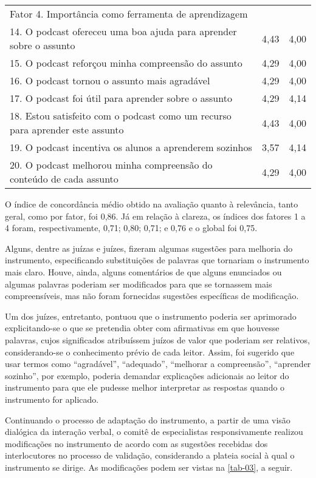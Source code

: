 \begin{table}[htpb]
\begin{threeparttable}
\begin{tabular}{p{10cm} l l}
Fator 4. Importância como ferramenta de aprendizagem & & \\
14. O podcast ofereceu uma boa ajuda para aprender sobre o assunto & 4,43 & 4,00 \\
15. O podcast reforçou minha compreensão do assunto & 4,29 & 4,00 \\
16. O podcast tornou o assunto mais agradável & 4,29 & 4,00 \\
17. O podcast foi útil para aprender sobre o assunto & 4,29 & 4,14 \\
18. Estou satisfeito com o podcast como um recurso para aprender este assunto & 4,43 & 4,00 \\
19. O podcast incentiva os alunos a aprenderem sozinhos & 3,57 & 4,14 \\
20. O podcast melhorou minha compreensão do conteúdo de cada assunto & 4,29 & 4,00 \\
\bottomrule	
\end{tabular}
\end{threeparttable}
\end{table}

O índice de concordância médio obtido na avaliação quanto à relevância, tanto
geral, como por fator, foi 0,86. Já em relação à clareza, os índices dos
fatores 1 a 4 foram, respectivamente, 0,71; 0,80; 0,71; e 0,76 e o global foi
0,75.

Alguns, dentre as juízas e juízes, fizeram algumas sugestões para melhoria do
instrumento, especificando substituições de palavras que tornariam o
instrumento mais claro. Houve, ainda, alguns comentários de que alguns
enunciados ou algumas palavras poderiam ser modificados para que se tornassem
mais compreensíveis, mas não foram fornecidas sugestões específicas de
modificação.

Um dos juízes, entretanto, pontuou que o instrumento poderia ser aprimorado
explicitando-se o que se pretendia obter com afirmativas em que houvesse
palavras, cujos significados atribuíssem juízos de valor que poderiam ser
relativos, considerando-se o conhecimento prévio de cada leitor. Assim, foi
sugerido que usar termos como \enquote{agradável}, \enquote{adequado},
\enquote{melhorar a compreensão}, \enquote{aprender sozinho}, por exemplo,
poderia demandar explicações adicionais ao leitor do instrumento para que ele
pudesse melhor interpretar as respostas quando o instrumento for aplicado.

Continuando o processo de adaptação do instrumento, a partir de uma visão
dialógica da interação verbal, o comitê de especialistas responsivamente
\cite{volochinov2013} realizou modificações no instrumento de acordo com as
sugestões recebidas dos interlocutores no processo de validação, considerando a
plateia social à qual o instrumento se dirige. As modificações podem ser vistas
na \cref{tab-03}, a seguir.

